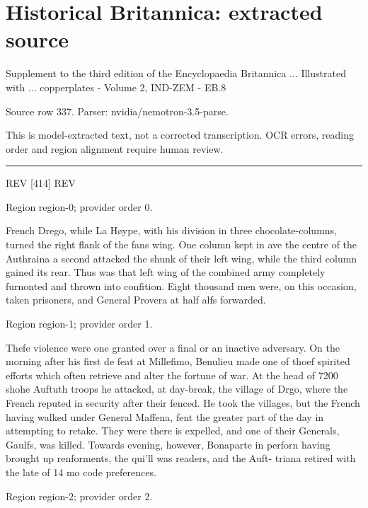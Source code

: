 \documentclass[11pt]{article}
\begin{document}
\section*{Historical Britannica: extracted source}
Supplement to the third edition of the Encyclopaedia Britannica ... Illustrated with ... copperplates - Volume 2, IND-ZEM - EB.8\par
{\small Source row 337. Parser: nvidia/nemotron-3.5-parse.\par}
{\small This is model-extracted text, not a corrected transcription. OCR errors, reading order and region alignment require human review.\par}
\hrule\medskip
REV [414] REV
\par

{\scriptsize\color{gray} Region region-0; provider order 0.\par}
\medskip

French Drego, while La Høype, with his division in three chocolate-columns, turned the right flank of the fans wing. One column kept in ave the centre of the Authraina a second attacked the shunk of their left wing, while the third column gained its rear. Thus was that left wing of the combined army completely furnonted and thrown into confition. Eight thousand men were, on this occasion, taken prisoners, and General Provera at half alfs forwarded.
\par

{\scriptsize\color{gray} Region region-1; provider order 1.\par}
\medskip

Thefe violence were one granted over a final or an inactive adversary. On the morning after his first de feat at Millefimo, Benulieu made one of thoef spirited efforts which often retrieve and alter the fortune of war. At the head of 7200 shohe Auftuth troops he attacked, at day-break, the village of Drgo, where the French reputed in security after their fenced. He took the villages, but the French having walked under General Maffena, fent the greater part of the day in attempting to retake. They were there is expelled, and one of their Generals, Gaulfs, was killed. Towards evening, however, Bonaparte in perforn having brought up renforments, the qui’ll was readers, and the Auft- triana retired with the late of 14 mo code preferences.
\par

{\scriptsize\color{gray} Region region-2; provider order 2.\par}
\medskip
\end{document}
